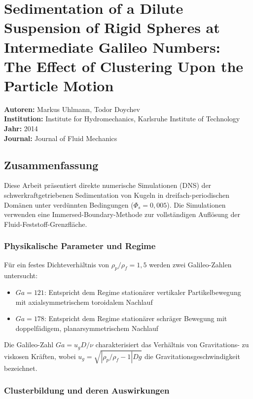 \documentclass[a4paper,12pt]{article}
\begin{document}
\section*{Sedimentation of a Dilute Suspension of Rigid Spheres at Intermediate Galileo Numbers: The Effect of Clustering Upon the Particle Motion}

\textbf{Autoren:} Markus Uhlmann, Todor Doychev \\
\textbf{Institution:} Institute for Hydromechanics, Karlsruhe Institute of Technology \\
\textbf{Jahr:} 2014 \\
\textbf{Journal:} Journal of Fluid Mechanics

\subsection*{Zusammenfassung}

Diese Arbeit präsentiert direkte numerische Simulationen (DNS) der schwerkraftgetriebenen Sedimentation von Kugeln in dreifach-periodischen Domänen unter verdünnten Bedingungen ($\Phi_s = 0{,}005$). Die Simulationen verwenden eine Immersed-Boundary-Methode zur vollständigen Auflösung der Fluid-Feststoff-Grenzfläche.

\subsubsection*{Physikalische Parameter und Regime}

Für ein festes Dichte\-verhältnis von $\rho_p/\rho_f = 1{,}5$ werden zwei Galileo-Zahlen untersucht:
\begin{itemize}
    \item $Ga = 121$: Entspricht dem Regime stationärer vertikaler Partikelbewegung mit axialsymmetrischem toroidalem Nachlauf
    \item $Ga = 178$: Entspricht dem Regime stationärer schräger Bewegung mit doppelfädigem, planarsymmetrischem Nachlauf
\end{itemize}

Die Galileo-Zahl $Ga = u_g D / \nu$ charakterisiert das Verhältnis von Gravitations- zu viskosen Kräften, wobei $u_g = \sqrt{|\rho_p/\rho_f - 1| D g}$ die Gravitationsgeschwindigkeit bezeichnet.

\subsubsection*{Clusterbildung und deren Auswirkungen}
\end{document}
